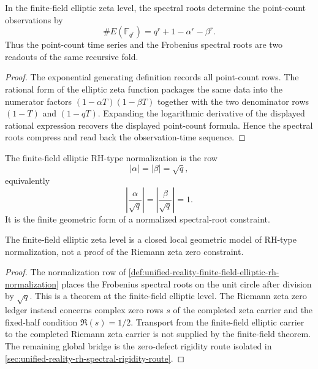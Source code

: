 \begin{theorem}
\label{thm:unified-reality-frobenius-roots-control-point-counts}
In the finite-field elliptic zeta level, the spectral roots determine
the point-count observations by
$$
\#E(\mathbb F_{q^r})
=
q^r+1-\alpha^r-\beta^r.
$$
Thus the point-count time series and the Frobenius spectral roots are
two readouts of the same recursive fold.
\end{theorem}

\begin{proof}
The exponential generating definition records all point-count rows.  The
rational form of the elliptic zeta function packages the same data into
the numerator factors $(1-\alpha T)(1-\beta T)$ together with the two
denominator rows $(1-T)$ and $(1-qT)$.  Expanding the logarithmic
derivative of the displayed rational expression recovers the displayed
point-count formula.  Hence the spectral roots compress and read back
the observation-time sequence.
\end{proof}

\begin{definition}
\label{def:unified-reality-finite-field-elliptic-rh-normalization}
The finite-field elliptic RH-type normalization is the row
$$
|\alpha|=|\beta|=\sqrt q,
$$
equivalently
$$
\left|\frac{\alpha}{\sqrt q}\right|
=
\left|\frac{\beta}{\sqrt q}\right|
=1.
$$
It is the finite geometric form of a normalized spectral-root constraint.
\end{definition}

\begin{theorem}
\label{thm:unified-reality-finite-field-elliptic-zeros-closed-model}
The finite-field elliptic zeta level is a closed local geometric model of
RH-type normalization, not a proof of the Riemann zeta zero constraint.
\end{theorem}

\begin{proof}
The normalization row of
\autoref{def:unified-reality-finite-field-elliptic-rh-normalization}
places the Frobenius spectral roots on the unit circle after division by
$\sqrt q$.  This is a theorem at the finite-field elliptic level.  The
Riemann zeta zero ledger instead concerns complex zero rows $s$ of the
completed zeta carrier and the fixed-half condition $\Re(s)=1/2$.
Transport from the finite-field elliptic carrier to the completed
Riemann zeta carrier is not supplied by the finite-field theorem.  The
remaining global bridge is the zero-defect rigidity route isolated in
\autoref{sec:unified-reality-rh-spectral-rigidity-route}.
\end{proof}

